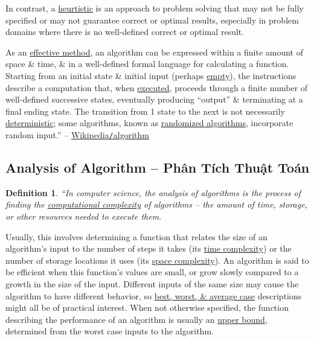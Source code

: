 \documentclass{article}
\newtheorem{definition}{Definition}
\begin{document}
In contrast, a \href{https://en.wikipedia.org/wiki/Heuristic_(computer_science)}{heurtistic} is an approach to problem solving that may not be fully specified or may not guarantee correct or optimal results, especially in problem domains where there is no well-defined correct or optimal result.

As an \href{https://en.wikipedia.org/wiki/Effective_method}{effective method}, an algorithm can be expressed within a finite amount of space \& time, \& in a well-defined formal language for calculating a function. Starting from an initial state \& initial input (perhaps \href{https://en.wikipedia.org/wiki/Empty_string}{empty}), the instructions describe a computation that, when \href{https://en.wikipedia.org/wiki/Execution_(computing)}{executed}, proceeds through a finite number of well-defined successive states, eventually producing ``output'' \& terminating at a final ending state. The transition from 1 state to the next is not necessarily \href{https://en.wikipedia.org/wiki/Deterministic}{deterministic}; some algorithms, known as \href{https://en.wikipedia.org/wiki/Randomized_algorithm}{randomized algorithms}, incorporate random input.'' -- \href{https://en.wikipedia.org/wiki/Algorithm}{Wikipedia\texttt{/}algorithm}

\subsection{Analysis of Algorithm -- Phân Tích Thuật Toán}

\begin{definition}
	``In computer science, the \emph{analysis of algorithms} is the process of finding the \href{https://en.wikipedia.org/wiki/Computational_complexity}{computational complexity} of algorithms -- the amount of time, storage, or other resources needed to execute them.
\end{definition}
Usually, this involves determining a function that relates the size of an algorithm's input to the number of steps it takes (its \href{https://en.wikipedia.org/wiki/Time_complexity}{time complexity}) or the number of storage locations it uses (its \href{https://en.wikipedia.org/wiki/Space_complexity}{space complexity}). An algorithm is said to be efficient when this function's values are small, or grow slowly compared to a growth in the size of the input. Different inputs of the same size may cause the algorithm to have different behavior, so \href{https://en.wikipedia.org/wiki/Best,_worst_and_average_case}{best, worst, \& average case} descriptions might all be of practical interest. When not otherwise specified, the function describing the performance of an algorithm is usually an \href{https://en.wikipedia.org/wiki/Upper_bound}{upper bound}, determined from the worst case inputs to the algorithm.
\end{document}

